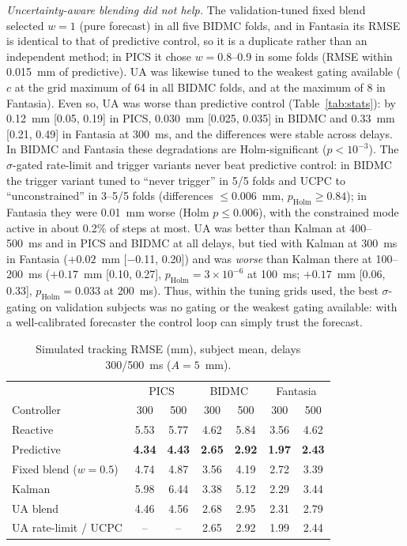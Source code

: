\documentclass[conference]{IEEEtran}
\begin{document}
\emph{Uncertainty-aware blending did not help.} The validation-tuned fixed blend selected $w=1$ (pure forecast) in all five BIDMC folds, and in Fantasia its RMSE is identical to that of predictive control, so it is a duplicate rather than an independent method; in PICS it chose $w=0.8$--0.9 in some folds (RMSE within 0.015~mm of predictive). UA was likewise tuned to the weakest gating available ($c$ at the grid maximum of 64 in all BIDMC folds, and at the maximum of 8 in Fantasia). Even so, UA was worse than predictive control (Table~\ref{tab:stats}): by 0.12~mm [0.05, 0.19] in PICS, 0.030~mm [0.025, 0.035] in BIDMC and 0.33~mm [0.21, 0.49] in Fantasia at 300~ms, and the differences were stable across delays. In BIDMC and Fantasia these degradations are Holm-significant ($p<10^{-3}$). The $\sigma$-gated rate-limit and trigger variants never beat predictive control: in BIDMC the trigger variant tuned to ``never trigger'' in 5/5 folds and UCPC to ``unconstrained'' in 3--5/5 folds (differences $\le$0.006~mm, $p_{\mathrm{Holm}}\ge0.84$); in Fantasia they were 0.01~mm worse (Holm $p\le0.006$), with the constrained mode active in about 0.2\% of steps at most. UA was better than Kalman at 400--500~ms and in PICS and BIDMC at all delays, but tied with Kalman at 300~ms in Fantasia ($+0.02$~mm [$-$0.11, 0.20]) and was \emph{worse} than Kalman there at 100--200~ms ($+0.17$~mm [0.10, 0.27], $p_{\mathrm{Holm}}=3\times10^{-6}$ at 100~ms; $+0.17$~mm [0.06, 0.33], $p_{\mathrm{Holm}}=0.033$ at 200~ms). Thus, within the tuning grids used, the best $\sigma$-gating on validation subjects was no gating or the weakest gating available: with a well-calibrated forecaster the control loop can simply trust the forecast.

\begin{table}[t]
\caption{Simulated tracking RMSE (mm), subject mean, delays 300/500~ms ($A{=}5$~mm).}
\label{tab:control}
\centering\footnotesize
\setlength{\tabcolsep}{2.5pt}
\begin{tabular}{@{}lcccccc@{}}
\toprule
 & \multicolumn{2}{c}{PICS} & \multicolumn{2}{c}{BIDMC} & \multicolumn{2}{c}{Fantasia}\\
Controller & 300 & 500 & 300 & 500 & 300 & 500\\
\midrule
Reactive & 5.53 & 5.77 & 4.62 & 5.84 & 3.56 & 4.62\\
Predictive & \textbf{4.34} & \textbf{4.43} & \textbf{2.65} & \textbf{2.92} & \textbf{1.97} & \textbf{2.43}\\
Fixed blend ($w{=}0.5$) & 4.74 & 4.87 & 3.56 & 4.19 & 2.72 & 3.39\\
Kalman & 5.98 & 6.44 & 3.38 & 5.12 & 2.29 & 3.44\\
UA blend & 4.46 & 4.56 & 2.68 & 2.95 & 2.31 & 2.79\\
UA rate-limit / UCPC & -- & -- & 2.65 & 2.92 & 1.99 & 2.44\\
\bottomrule
\end{tabular}
\par{}
\end{table}
\end{document}
